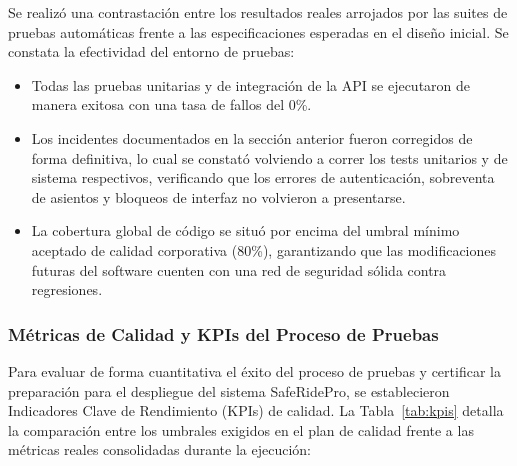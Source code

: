 \documentclass{article}
\begin{document}
Se realizó una contrastación entre los resultados reales arrojados por las suites de pruebas automáticas frente a las especificaciones esperadas en el diseño inicial. Se constata la efectividad del entorno de pruebas:
\begin{itemize}
    \item Todas las pruebas unitarias y de integración de la API se ejecutaron de manera exitosa con una tasa de fallos del 0\%.
    \item Los incidentes documentados en la sección anterior fueron corregidos de forma definitiva, lo cual se constató volviendo a correr los tests unitarios y de sistema respectivos, verificando que los errores de autenticación, sobreventa de asientos y bloqueos de interfaz no volvieron a presentarse.
    \item La cobertura global de código se situó por encima del umbral mínimo aceptado de calidad corporativa (80\%), garantizando que las modificaciones futuras del software cuenten con una red de seguridad sólida contra regresiones.
\end{itemize}

\subsubsection*{Métricas de Calidad y KPIs del Proceso de Pruebas}

Para evaluar de forma cuantitativa el éxito del proceso de pruebas y certificar la preparación para el despliegue del sistema SafeRidePro, se establecieron Indicadores Clave de Rendimiento (KPIs) de calidad. La Tabla~\ref{tab:kpis} detalla la comparación entre los umbrales exigidos en el plan de calidad frente a las métricas reales consolidadas durante la ejecución:
\end{document}
